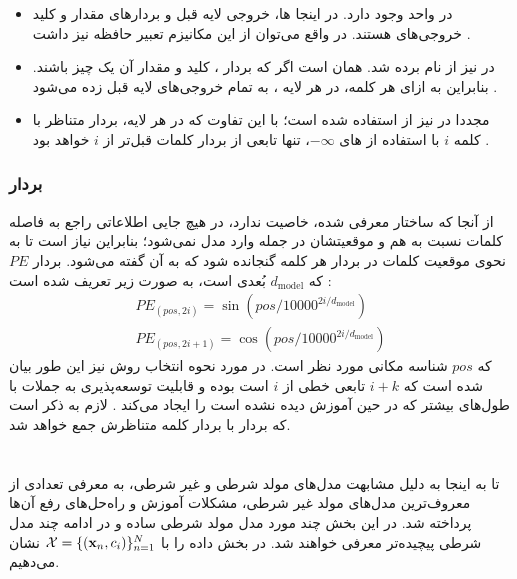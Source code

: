 \begin{itemize}
	\item
	      در \decoder{} واحد \multiheadattention{} وجود دارد. در اینجا \query{} ها، خروجی لایه قبل \decoder{} و بردارهای مقدار و کلید خروجی‌های \encoder{} هستند. در واقع می‌توان از این مکانیزم تعبیر حافظه نیز داشت \cite{transformer}.
	\item
	      در \encoder{} نیز از \multiheadselfattention{} نام برده شد. \multiheadselfattention{} همان \multiheadattention{} است اگر که بردار \query{}، کلید و مقدار آن یک چیز باشند. بنابراین به ازای هر کلمه، در هر لایه \encoder{}، به تمام خروجی‌های لایه قبل \multiheadselfattention{} زده می‌شود \cite{transformer}.
	\item
	      مجددا در \decoder{} نیز از \multiheadselfattention{} استفاده شده است؛ با این تفاوت که در هر لایه، بردار متناظر با کلمه $i$ با استفاده از \mask{}‌های $-\infty$، تنها تابعی از بردار کلمات قبل‌تر از $i$ خواهد بود \cite{transformer}.
\end{itemize}

\subsubsection{بردار
	}
از آنجا که ساختار معرفی شده، خاصیت \recurrence{} ندارد، در هیچ جایی اطلاعاتی راجع به فاصله کلمات نسبت به هم و موقعیتشان در جمله وارد مدل نمی‌شود؛ بنابراین نیاز است تا به نحوی موقعیت کلمات در بردار \embedding{} هر کلمه گنجانده شود که به آن \positionalembedding{} گفته می‌شود. بردار \positionalembedding{}
$PE$
که $d_\text{model}$ بُعدی است، به صورت زیر تعریف شده است \cite{transformer}:
\begin{align}
	PE_{(pos, 2i)} = \sin ( pos / 10000^{2i/d_\text{model}}) \nonumber
	\\
	PE_{(pos, 2i+1)} = \cos ( pos / 10000^{2i/d_\text{model}})
\end{align}
که $pos$ شناسه مکانی مورد نظر است. در مورد نحوه انتخاب روش \encoding{} نیز این طور بیان شده است که
\positionalembedding{}  $i+k$
تابعی خطی از
\positionalembedding{} $i$
است بوده و قابلیت توسعه‌پذیری به جملات با طول‌های بیشتر که در حین آموزش دیده نشده است را ایجاد می‌کند \cite{transformer}. لازم به ذکر است که بردار \positionalembedding{} با بردار \embedding{} کلمه متناظرش جمع خواهد شد.

\section{\condtg}
تا به اینجا به دلیل مشابهت مدل‌های مولد شرطی و غیر شرطی، به معرفی تعدادی از معروف‌ترین مدل‌های مولد غیر شرطی، مشکلات آموزش و راه‌حل‌های رفع آن‌ها پرداخته شد. در این بخش چند مورد مدل مولد شرطی ساده و در ادامه چند مدل شرطی پیچیده‌تر معرفی خواهند شد. در بخش داده را با ${\mathcal{X}} = \{({\bf x}_n, c_i)\}_{n=1}^N$ نشان می‌دهیم.
